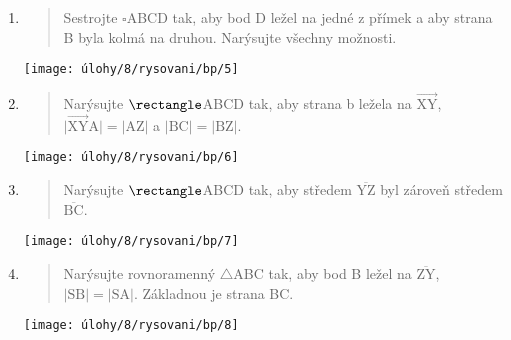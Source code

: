 \begin{enumerate}
\begin{minipage}[t]{\linewidth}
    \end{minipage}

    \item
    \begin{minipage}[t]{\linewidth}
        \begin{quote}
            Sestrojte $\square$ABCD tak, aby bod D ležel na jedné z přímek a aby strana B byla kolmá na druhou.
            Narýsujte všechny možnosti.
        \end{quote}
        \centering
        \texttt{[image: úlohy/8/rysovani/bp/5]}

    \end{minipage}

    \item
    \begin{minipage}[t]{\linewidth}
        \begin{quote}
            Narýsujte $\rectangle$ABCD tak, aby strana b ležela na $\overrightarrow{\text{XY}}$, $\lvert \overrightarrow{\text{XY}} \text{A} \rvert = \lvert \text{AZ} \rvert$ a $\lvert \text{BC} \rvert = \lvert \text{BZ} \rvert$.
        \end{quote}
        \centering
        \texttt{[image: úlohy/8/rysovani/bp/6]}

    \end{minipage}

    \item
    \begin{minipage}[t]{\linewidth}
        \begin{quote}
            Narýsujte $\rectangle$ABCD tak, aby středem $\overline{\text{YZ}}$ byl zároveň středem $\overline{\text{BC}}$.
        \end{quote}
        \centering
        \texttt{[image: úlohy/8/rysovani/bp/7]}

    \end{minipage}

    \item
    \begin{minipage}[t]{\linewidth}
        \begin{quote}
            Narýsujte rovnoramenný $\triangle$ABC tak, aby bod B ležel na $\overline{\text{ZY}}$, $\lvert \text{SB} \rvert = \lvert \text{SA} \rvert$.
            Základnou je strana BC\@.
        \end{quote}
        \centering
        \texttt{[image: úlohy/8/rysovani/bp/8]}


\end{minipage}
\end{enumerate}
